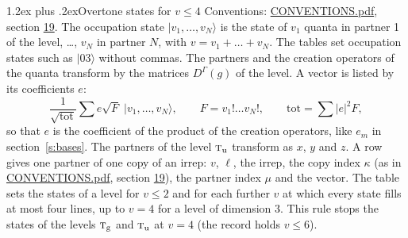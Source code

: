 \documentclass[10pt,a4paper]{article}
\makeatletter
\renewcommand\section{\@startsection{section}{1}{\z@}{-3ex plus -1ex minus -.2ex}%
  {1.2ex plus .2ex}{\normalfont\large\sffamily\bfseries\color{parttitle}}}
\numberwithin{equation}{section}
\newcommand{\irr}[1]{\text{\normalfont\scshape #1}}
\newcommand{\ptag}[1]{\mathrm{#1}}
\newcommand{\repD}[1]{D^{#1}}
\newcommand{\mult}{\kappa}
\newcommand{\intx}{\mu}
\newcommand{\occ}[1]{\lvert #1\rangle}
\makeatother
\begin{document}
\section{Overtone states for \texorpdfstring{$v \le 4$}{v \textleq\ 4}}\label{s:overtone_states}
Conventions: \href{../../CONVENTIONS.pdf}{CONVENTIONS.pdf}, section \href{../../CONVENTIONS.pdf\#conv.19}{19}.
\leavevmode\label{n:vector.occupation}\label{n:local.quanta.partner}\label{n:local.weight.occupation}The occupation state $\occ{v_1, \dots, v_N}$ is the state of $v_1$ quanta in partner 1 of the level, \dots, $v_N$ in partner $N$, with $v = v_1 + \dots + v_N$. The tables set occupation states such as $\occ{03}$ without commas. The partners and the creation operators of the quanta transform by the matrices $\repD{\Gamma}(g)$ of the level. A vector is listed by its coefficients $e$:
\begin{equation}\label{e:occupation}\frac{1}{\sqrt{\mathrm{tot}}}\sum e\sqrt{F}\;\occ{v_1, \dots, v_N},\qquad F = v_1!\dots v_N!,\qquad \mathrm{tot} = \sum |e|^2F,\end{equation}
so that $e$ is the coefficient of the product of the creation operators, like $e_m$ in section~\ref{s:bases}. The partners of the level $\irr{t}_{\ptag{u}}$ transform as $x$, $y$ and $z$. A row gives one partner of one copy of an irrep: $v$, $\ell$, the irrep, the copy index $\mult$ (as in \href{../../CONVENTIONS.pdf}{CONVENTIONS.pdf}, section \href{../../CONVENTIONS.pdf\#conv.19}{19}), the partner index $\intx$ and the vector.
The table sets the states of a level for $v \le 2$ and for each further $v$ at which every state fills at most four lines, up to $v = 4$ for a level of dimension 3. This rule stops the states of the levels $\irr{t}_{\ptag{g}}$ and $\irr{t}_{\ptag{u}}$ at $v = 4$ (the record holds $v \le 6$).
\end{document}
